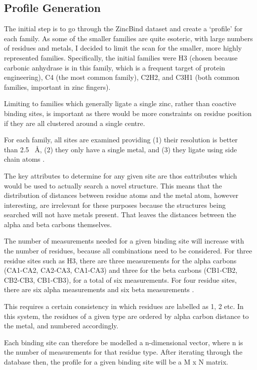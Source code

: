 \subsection{Profile Generation}

The initial step is to go through the ZincBind dataset and create a `profile' for each family. As some of the smaller families are quite esoteric, with large numbers of residues and metals, I decided to limit the scan for the smaller, more highly represented families. Specifically, the initial families were H3 (chosen because carbonic anhydrase is in this family, which is a frequent target of protein engineering), C4 (the most common family), C2H2, and C3H1 (both common families, important in zinc fingers).

Limiting to families which generally ligate a single zinc, rather than coactive binding sites, is important as there would be more constraints on residue position if they are all clustered around a single centre.

For each family, all sites are examined providing (1) their resolution is better than 2.5 ~{\AA}, (2) they only have a single metal, and (3) they ligate using side chain atoms .

The key attributes to determine for any given site are thos eattributes which would be used to actually search a novel structure. This means that the distribution of distances between residue atoms and the metal atom, however interesting, are irrelevant for these purposes because the structures being searched will not have metals present. That leaves the distances between the alpha and beta carbons themselves.

The number of measurements needed for a given binding site will increase with the number of residues, because all combinations need to be considered. For three residue sites such as H3, there are three measurements for the alpha carbons (CA1-CA2, CA2-CA3, CA1-CA3) and three for the beta carbons (CB1-CB2, CB2-CB3, CB1-CB3), for a total of six measurements. For four residue sites, there are six alpha measurements and six beta measurements .

This requires a certain consistency in which residues are labelled as 1, 2 etc. In this system, the residues of a given type are ordered by alpha carbon distance to the metal, and numbered accordingly.

Each binding site can therefore be modelled a n-dimensional vector, where n is the number of measurements for that residue type. After iterating through the database then, the profile for a given binding site will be a M x N matrix.